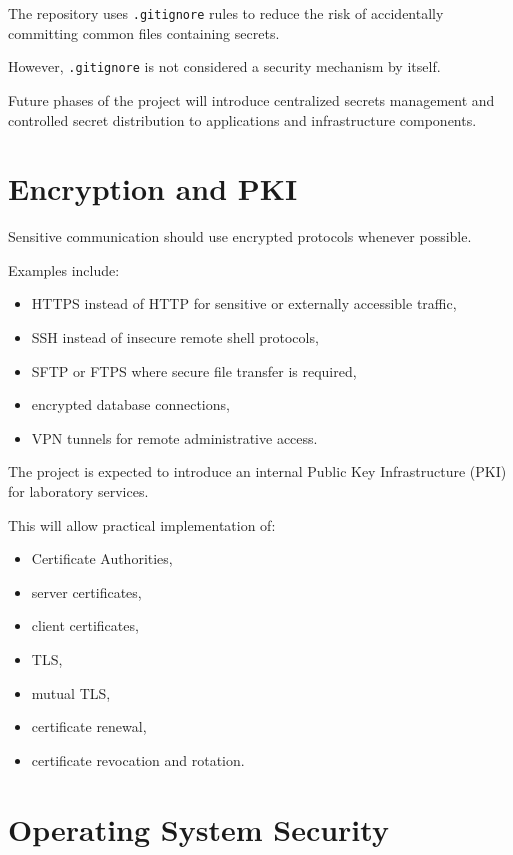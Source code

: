 The repository uses \texttt{.gitignore} rules to reduce the risk of
accidentally committing common files containing secrets.

However, \texttt{.gitignore} is not considered a security mechanism by
itself.

Future phases of the project will introduce centralized secrets management
and controlled secret distribution to applications and infrastructure
components.


\section{Encryption and PKI}

Sensitive communication should use encrypted protocols whenever possible.

Examples include:

\begin{itemize}
    \item HTTPS instead of HTTP for sensitive or externally accessible traffic,
    \item SSH instead of insecure remote shell protocols,
    \item SFTP or FTPS where secure file transfer is required,
    \item encrypted database connections,
    \item VPN tunnels for remote administrative access.
\end{itemize}

The project is expected to introduce an internal Public Key Infrastructure
(PKI) for laboratory services.

This will allow practical implementation of:

\begin{itemize}
    \item Certificate Authorities,
    \item server certificates,
    \item client certificates,
    \item TLS,
    \item mutual TLS,
    \item certificate renewal,
    \item certificate revocation and rotation.
\end{itemize}


\section{Operating System Security}

